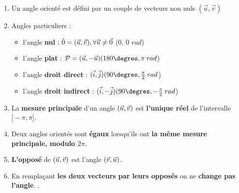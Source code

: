 \begin{multicols}{2}

\begin{enumerate}
\item Un angle orienté est défini par un couple de vecteurs non nuls $(\vec{u}, \vec{v})$

\item Angles particuliers :
\begin{itemize}
	\item l'angle \textbf{nul} : $\hat{0} = (\vec{u}, \vec{v}) , \forall \vec{u} \neq \vec{0} $  (0\degres, 0 $rad$)
	\item l'angle \textbf{plat} :  $\mathcal{P} = \aopn{u}{u} (180\degres, \pi \:rad $)
	\item l'angle \textbf{droit direct} : $\aopp{i}{j} (90\degres, \frac{\pi}{2} \: rad$)
	\item l'angle \textbf{droit indirect} : $\aopn{i}{j} (90\degres, -\frac{\pi}{2} \: rad$)
\end{itemize}

\item La \textbf{mesure principale} d'un angle $(\vec{u}, \vec{v})$ est \textbf{l'unique réel} de l'intervalle $]-\pi, \pi]$.

\item Deux angles orientés sont \textbf{égaux} lorsqu'ils ont \textbf{la même mesure principale, modulo $2\pi$}.

\item \textbf{L'opposé} de $(\vec{u}, \vec{v})$ est l'angle $(\vec{v}, \vec{u})$. %

\item En remplaçant \textbf{les deux vecteurs par leurs opposés} on ne \textbf{change pas l'angle}. %
.
\end{enumerate}
\end{multicols}